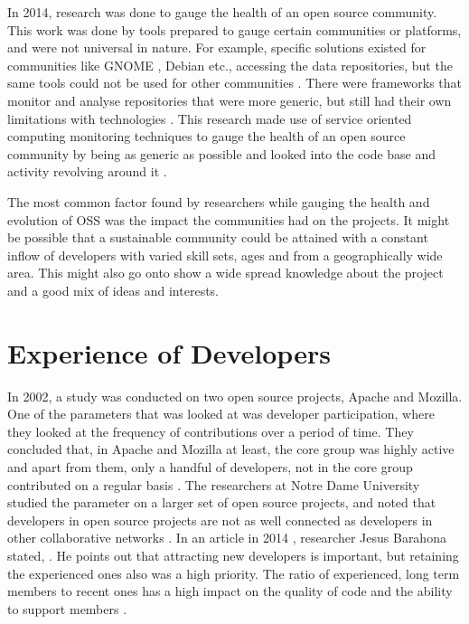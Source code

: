 \documentclass[double,12pt]{beavtex}
\begin{document}
In 2014, research was done to gauge the health of an open source community. This work was done by tools prepared to gauge certain communities or platforms, and were not universal
in nature. For example, specific solutions existed for communities like GNOME \cite{gno}, Debian \cite{ver2011} etc., accessing the data repositories, but the same tools could not be used for other communities \cite{gno}. There were frameworks that monitor and analyse repositories that were more generic, but still had their own limitations with technologies \cite{marc2014}. This research made use of service oriented computing monitoring techniques to gauge the health of an open source community by being as generic as possible and looked into the code base and activity revolving around it \cite{marc2014}. 

The most common factor found by researchers while gauging the health and evolution of OSS was the impact the communities had on the projects. It might be possible that a sustainable community could be attained with a constant inflow of developers with varied skill sets, ages and from a geographically wide area. This might also go onto show a wide spread knowledge about the project and a good mix of ideas and interests. 


\section{Experience of Developers}
In 2002, a study was conducted on two open source projects, Apache and Mozilla. One of the parameters that was looked at was developer participation, where they looked at the frequency of contributions over a period of time. They concluded that, in Apache and Mozilla at least, the core group was highly active and apart from them, only a handful of developers, not in the core group contributed on a regular basis \cite{mockus2002}. The researchers at Notre Dame University studied the parameter on a larger set of open source projects, and noted that developers in open source projects are not as well connected as developers in other collaborative networks \cite{greg2002}. 
In an article in 2014 \cite{jes2014}, researcher Jesus Barahona stated, . He points out that attracting new developers is important, but retaining the experienced ones also was a high priority. The ratio of experienced, long term members to recent ones has a high impact on the quality of code and the ability to support members \cite{jes2014}.
\end{document}
